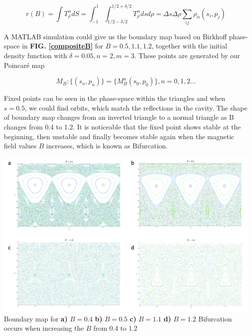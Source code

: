 \documentclass[a0,portrait]{a0poster}
\begin{document}
\begin{multicols}{3}
\begin{equation}
r(B)=\int T^{\alpha}_{\rho} dS=\int_{-1}^{1}\int_{1/2-\delta/2}^{1/2+\delta/2} T^{\alpha}_{\rho} dsd\rho=\Delta s \Delta \rho \sum_{ij} \rho_{\alpha}(s_i,p_j)
\end{equation}

A MATLAB simulation could give us the boundary map based on Birkhoff phase-space in \textbf{FIG. \ref{compositeB}} for $B=0.5, 1.1, 1.2$, together with the initial density function with $\delta=0.05, n=2, m=3$. These points are generated by our Poincaré map

\begin{equation}
M_B: \{(s_n,p_n)\}=\{M^n_B(s_0,p_0)\}, n=0,1,2...   
\end{equation}

Fixed points can be seen in the phase-space within the triangles and when $s=0.5$, we could find orbits, which match the reflections in the cavity. The shape of boundary map changes from an inverted triangle to a normal triangle as B changes from 0.4 to 1.2. It is noticeable that the fixed point shows stable at the beginning, then unstable and finally becomes stable again when the magnetic field values $B$ increases, which is known as Bifurcation. 

\begin{center}\vspace{1cm}
\includegraphics[width=0.85\linewidth]{compositeB.png}
 {Boundary map for \textbf{a)} $B=0.4$ \textbf{b)} $B=0.5$ \textbf{c)} $B=1.1$ \textbf{d)} $B=1.2$ Bifurcation occurs when increasing the $B$ from 0.4 to 1.2}
\label{compositeB}
\end{center}%


\end{multicols}
\end{document}
